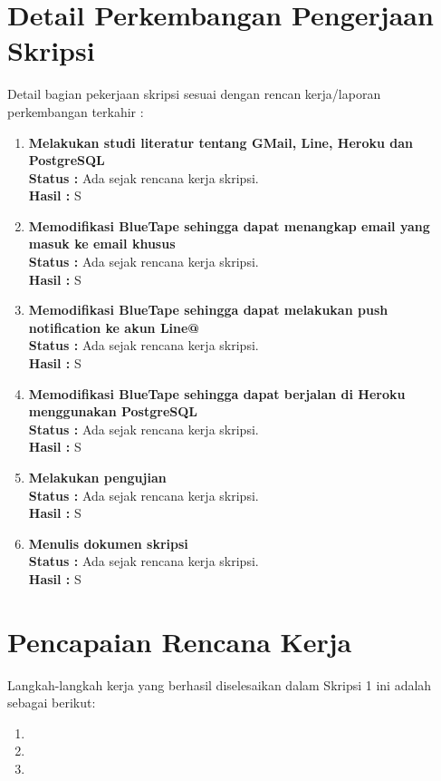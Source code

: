 \documentclass[a4paper,twoside]{article}
\begin{document}
\section{Detail Perkembangan Pengerjaan Skripsi}
Detail bagian pekerjaan skripsi sesuai dengan rencan kerja/laporan perkembangan terkahir :
	\begin{enumerate}
		\item \textbf{Melakukan studi literatur tentang GMail, Line, Heroku dan PostgreSQL}\\
		{\bf Status :} Ada sejak rencana kerja skripsi.\\
		{\bf Hasil :} S
		\item \textbf{Memodifikasi BlueTape sehingga dapat menangkap email yang masuk ke email khusus}\\
		{\bf Status :} Ada sejak rencana kerja skripsi.\\
		{\bf Hasil :} S
		\item \textbf{Memodifikasi BlueTape sehingga dapat melakukan push notification ke akun Line@}\\
		{\bf Status :} Ada sejak rencana kerja skripsi.\\
		{\bf Hasil :} S
		\item \textbf{Memodifikasi BlueTape sehingga dapat berjalan di Heroku menggunakan PostgreSQL}\\
		{\bf Status :} Ada sejak rencana kerja skripsi.\\
		{\bf Hasil :} S
		\item \textbf{Melakukan pengujian}\\
		{\bf Status :} Ada sejak rencana kerja skripsi.\\
		{\bf Hasil :} S
		\item \textbf{Menulis dokumen skripsi}\\
		{\bf Status :} Ada sejak rencana kerja skripsi.\\
		{\bf Hasil :} S
	\end{enumerate}

\section{Pencapaian Rencana Kerja}
Langkah-langkah kerja yang berhasil diselesaikan dalam Skripsi 1 ini adalah sebagai berikut:
\begin{enumerate}
\item
\item
\item
\end{enumerate}
\end{document}
